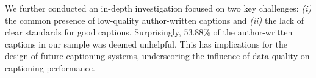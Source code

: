 We further conducted an in-depth investigation focused on two key challenges: {\em (i)} the common presence of low-quality author-written captions and {\em (ii)} the lack of clear standards for good captions.
Surprisingly, 53.88\% of the author-written captions in our sample was deemed unhelpful.
This has implications for the design of future captioning systems, underscoring the influence of data quality on captioning performance.

